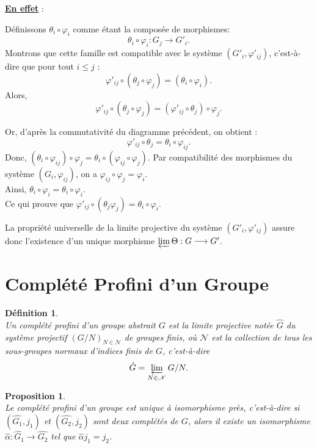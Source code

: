\documentclass[a4paper, 14pt]{report}
\newtheorem{definition}{Définition}[section]
\newtheorem{proposition}{Proposition}[section]
\begin{document}
\begin{onehalfspace}
{			\textbf{\underline{En effet}} :
			
Définissons $\theta_i \circ \varphi_i$ comme étant la composée de morphismes:
			\[
			\theta_i \circ \varphi_i : G_j \to G'_i.
			\]
Montrons que cette famille est compatible avec le système $(G'_i, \varphi'_{ij})$, c'est-à-dire que pour tout $i \leq j$ :
			\[
			\varphi'_{ij} \circ (\theta_j \circ \varphi_j) = (\theta_i \circ \varphi_i).
			\]	
			Alors, 
			\[
			\varphi'_{ij} \circ (\theta_j \circ \varphi_j) = (\varphi'_{ij} \circ \theta_j) \circ \varphi_j.
			\]
			
			Or, d’après la commutativité du diagramme précédent, on obtient :
			\[
			\varphi'_{ij} \circ \theta_j = \theta_i \circ \varphi_{ij}.
			\]
			Donc, \((\theta_i \circ \varphi_{ij}) \circ \varphi_j = \theta_i \circ (\varphi_{ij} \circ \varphi_j).\)
			Par compatibilité des morphismes du système $(G_i, \varphi_{ij})$, on a
			\(\varphi_{ij} \circ \varphi_j = \varphi_i.\) \\
			Ainsi,
			\(
			\theta_i \circ \varphi_i = \theta_i \circ \varphi_i.
			\) \\
			Ce qui prouve que 
			\(
			\varphi'_{ij} \circ (\theta_j \varphi_j) = \theta_i \circ \varphi_i.
			\)
			
La propriété universelle de la limite projective du système $(G'_i, \varphi'_{ij})$ assure donc l'existence d'un unique morphisme $\varprojlim \Theta : G \longrightarrow G'$.
			
			
			\section{Complété Profini d'un Groupe }
			
			\begin{definition} \cite{herfort2012profinite}\\
Un complété profini d’un groupe abstrait \( G \) est la limite projective notée $\widehat{G}$ du système projectif \( (G/N)_{N \in \mathscr{N}} \) de groupes finis, où \( \mathscr{N} \) est la collection de tous les sous-groupes normaux d’indices finis de \( G \), c’est-à-dire
				\[
				\hat{G} = \varprojlim_{N \in \mathscr{N}} G/N.
				\]
			\end{definition}
			
			\begin{proposition} \cite{herfort2012profinite}\\
Le complété profini d’un groupe est unique à isomorphisme près, c’est-à-dire si $(\widehat{G_1}, j_1)$ et $(\widehat{G_2}, j_2)$ sont deux complétés de $G$, alors il existe un isomorphisme $\widehat{\alpha} : \widehat{G_1} \to \widehat{G_2}$ tel que $\widehat{\alpha} j_1 = j_2$.
			\end{proposition}
	


}
\end{onehalfspace}
\end{document}
